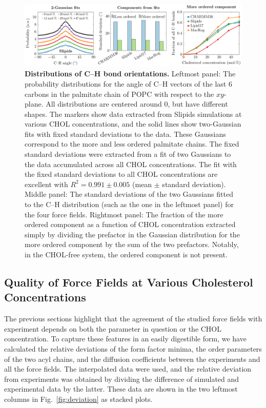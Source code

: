 \documentclass[journal=jctcce]{achemso}
\begin{document}
\begin{figure}[htb!]
    \centering
    \includegraphics[width=\linewidth]{../FIGS/CH.pdf}
    \caption{\label{fig:chdist}%
    \textbf{Distributions of C--H bond orientations.}
    Leftmost panel: The probability distributions for the angle of C--H vectors of the last 6 carbons in the palmitate chain of POPC with respect to the $xy$-plane. All distributions are centered around 0, but have different shapes. The markers show data extracted from Slipids simulations at various CHOL concentrations, and the solid lines show two-Gaussian fits with fixed standard deviations to the data. These Gaussians correspond to the more and less ordered palmitate chains. The fixed standard deviations were extracted from a fit of two Gaussians to the data accumulated across all CHOL concentrations. The fit with the fixed standard deviations to all CHOL concentrations are excellent with $R^2=0.991\pm 0.005$ (mean $\pm$ standard deviation).
    Middle panel: The standard deviations of the two Gaussians fitted to the C--H distribution (such as the one in the leftmost panel) for the four force fields. 
    Rightmost panel: The fraction of the more ordered component as a function of CHOL concentration extracted simply by dividing the prefactor in the Gaussian distribution for the more ordered component by the sum of the two prefactors. Notably, in the CHOL-free system, the ordered component is not present.
    }
\end{figure}


\subsection{Quality of Force Fields at Various Cholesterol Concentrations}

The previous sections highlight that the agreement of the studied force fields with experiment depends on both the parameter in question or the CHOL concentration. To capture these features in an easily digestible form, we have calculated the relative deviations of the form factor minima, the order parameters of the two acyl chains, and the diffusion coefficients between the experiments and all the force fields. The interpolated data were used, and the relative deviation from experiments was obtained by dividing the difference of simulated and experimental data by the latter. These data are shown in the two leftmost columns in Fig.~\ref{fig:deviation} as stacked plots.
\end{document}
